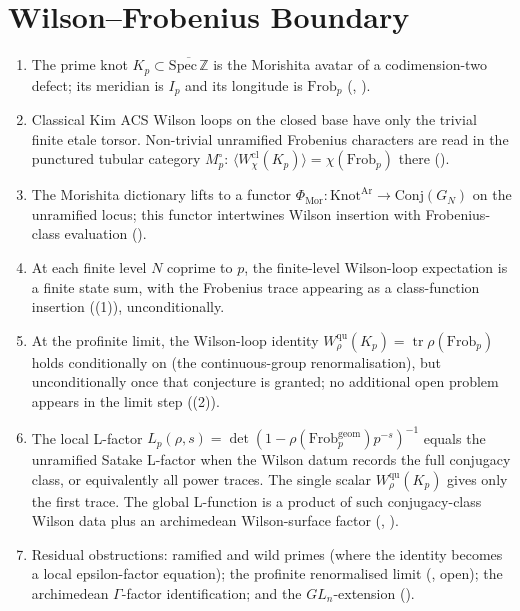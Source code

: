 \section{Wilson--Frobenius Boundary}
\label{v4-arith:w9-r1:summary}

\begin{enumerate}
\item The prime knot \(K_{p}\subset\overline{\mathrm{Spec}\,\mathbb Z}\)
is the Morishita avatar of a codimension-two defect; its meridian is
\(I_{p}\) and its longitude is \(\mathrm{Frob}_{p}\)
(,
).

\item Classical Kim ACS Wilson loops on the closed base have only the
trivial finite etale torsor. Non-trivial unramified Frobenius characters
are read in the punctured tubular category \(M_{p}^{\circ}\):
\(\langle W^{\mathrm{cl}}_{\chi}(K_{p})\rangle=\chi(\mathrm{Frob}_{p})\)
there
().

\item The Morishita dictionary lifts to a functor
\(\Phi_{\mathrm{Mor}}\colon\mathrm{Knot}^{\mathrm{Ar}}\to\mathrm{Conj}(G_{N})\)
on the unramified locus; this functor intertwines Wilson insertion
with Frobenius-class evaluation
().

\item At each finite level \(N\) coprime to \(p\), the finite-level
Wilson-loop expectation is a finite state sum, with the Frobenius
trace appearing as a class-function insertion
((1)), unconditionally.

\item At the profinite limit, the Wilson-loop identity
\(W^{\mathrm{qu}}_{\rho}(K_{p})=\operatorname{tr}\rho(\mathrm{Frob}_{p})\)
holds conditionally on
 (the continuous-group
renormalisation), but unconditionally once that conjecture is granted;
no additional open problem appears in the limit step
((2)).

\item The local L-factor
\(L_{p}(\rho,s)=\det(1-\rho(\mathrm{Frob}_{p}^{\mathrm{geom}})p^{-s})^{-1}\)
equals the unramified Satake L-factor when the Wilson datum records the
full conjugacy class, or equivalently all power traces. The single
scalar \(W^{\mathrm{qu}}_{\rho}(K_{p})\) gives only the first trace. The
global L-function is a product of such conjugacy-class Wilson data plus an
archimedean Wilson-surface factor
(,
).

\item Residual obstructions: ramified and wild primes (where the identity
becomes a local epsilon-factor equation); the profinite renormalised limit
(, open); the archimedean
\(\Gamma\)-factor identification; and the \(GL_{n}\)-extension
().
\end{enumerate}

